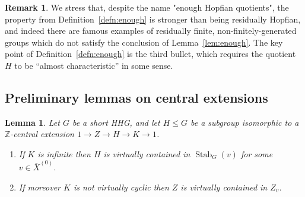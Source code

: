 \documentclass[svgnames]{amsart}
\theoremstyle{plain}
\newtheorem{lemma}[thm]{Lemma}
\theoremstyle{definition}
\newtheorem{rem}[thm]{Remark}
\newcommand{\ov}[1]{\overline{#1}}
\newcommand{\Stab}[2]{\operatorname{Stab}_{#1}(#2)}
\begin{document}
\begin{rem}\label{rem:almost_char_hopf_quotients}
   We stress that, despite the name "enough Hopfian quotients", the property from Definition~\ref{defn:enough} is stronger than being residually Hopfian, and indeed there are famous examples of residually finite, non-finitely-generated groups which do not satisfy the conclusion of Lemma~\ref{lem:enough}. The key point of Definition~\ref{defn:enough} is the third bullet, which requires the quotient $H$ to be ``almost characteristic'' in some sense.
\end{rem}


\subsection{Preliminary lemmas on central extensions}
\begin{lemma}
\label{lem:central_ext_peripheral}
    Let $G$ be a short HHG, and let $H\le G$ be a subgroup isomorphic to a $\mathbb Z$-central extension $1\to Z\to H\to K\to 1$.
    \begin{enumerate}
        \item If $K$ is infinite then $H$ is virtually contained in $\Stab{G}{v}$ for some $v\in \ov{X}^{(0)}$.
        \item If moreover $K$ is not virtually cyclic then $Z$ is virtually contained in $Z_v$.
    \end{enumerate}
\end{lemma}
\end{document}
